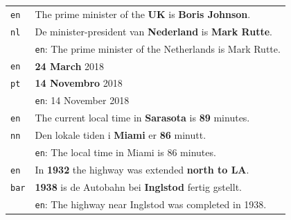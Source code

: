 \begin{table}[t!]

        \centering\small
        \begin{tabular}{ll}
            \toprule

            \texttt{en}  & The prime minister of the \textbf{UK} is \textbf{Boris Johnson}.          \\
            \texttt{nl}  & De minister-president van \textbf{Nederland} is \textbf{Mark Rutte}.      \\
                         & \small{\texttt{en}: The prime minister of the Netherlands is Mark Rutte.} \\
            \midrule
            \texttt{en}  & \textbf{24 March} 2018                                                    \\
            \texttt{pt}  & \textbf{14 Novembro} 2018                                                 \\
                         & \small{\texttt{en}: 14 November 2018 }                                    \\
            \midrule
            \texttt{en}  & The current local time in \textbf{Sarasota} is \textbf{89} minutes.       \\
            \texttt{nn}  & Den lokale tiden i \textbf{Miami} er \textbf{86} minutt.                  \\
                         & \small{\texttt{en}: The local time in Miami is 86 minutes.}               \\
            \midrule
            \texttt{en}  & In \textbf{1932} the highway was extended \textbf{north to LA}.           \\
            \texttt{bar} & \textbf{1938} is de Autobahn bei \textbf{Inglstod} fertig gstellt.        \\
                         & \small{\texttt{en}: The highway near Inglstod was completed in 1938.}     \\

\end{tabular}
\end{table}
